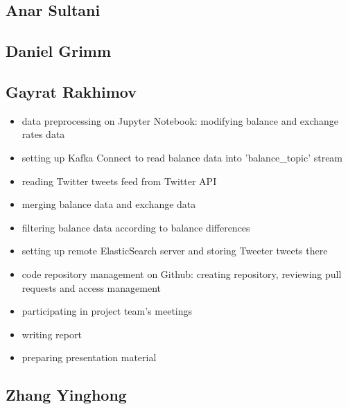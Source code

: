 \documentclass{article}
\begin{document}
\subsection{Anar Sultani}

\subsection{Daniel Grimm}

\subsection{Gayrat Rakhimov}

\begin{itemize}
    \item data preprocessing on Jupyter Notebook: modifying balance and exchange rates data
    \item setting up Kafka Connect to read balance data into 'balance\_topic' stream
    \item reading Twitter tweets feed from Twitter API
    \item merging balance data and exchange data
    \item filtering balance data according to balance differences
    \item setting up remote ElasticSearch server and storing Tweeter tweets there
    \item code repository management on Github: creating repository, reviewing pull requests and access management
    \item participating in project team's meetings
    \item writing report
    \item preparing presentation material
\end{itemize}

\subsection{Zhang Yinghong}
\end{document}
